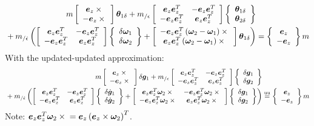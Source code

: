 \documentclass[10pt,fleqn,subeqn]{report}
\newcommand{\T}[1]{\bm{#1}}
\newcommand{\equu}{\overset{\text{uu}}{=}}
\begin{document}
\begin{align}
	m \sqbr{\matr{c}{
		\T{e}_z \times{}
		\\
		-\T{e}_z \times{}
	}} \T{\theta}_{1\delta}
	+
	m_{/\epsilon} \sqbr{\matr{cc}{
		\T{e}_z \T{e}_z^T & -\T{e}_z \T{e}_z^T
		\\
		-\T{e}_z \T{e}_z^T & \T{e}_z \T{e}_z^T
	}} \cubr{\cvvect{
		\T{\theta}_{1\delta}
		\\
		\T{\theta}_{2\delta}
	}}
	& \nonumber \\
	\mbox{} +
	m_{/\dot{\epsilon}} \plbr{
	\sqbr{\matr{cc}{
		\T{e}_z \T{e}_z^T & -\T{e}_z \T{e}_z^T
		\\
		-\T{e}_z \T{e}_z^T & \T{e}_z \T{e}_z^T
	}} \cubr{\cvvect{
		\delta\T{\omega}_1
		\\
		\delta\T{\omega}_2
	}}
	+
	\sqbr{\matr{c}{
		-\T{e}_z \T{e}_z^T \plbr{\T{\omega}_2 - \T{\omega}_1}\times{}
		\\
		\T{e}_z \T{e}_z^T \plbr{\T{\omega}_2 - \T{\omega}_1}\times{}
	}} \T{\theta}_{1\delta}
	}
	&=
	\cubr{\cvvect{
		\T{e}_z
		\\
		-\T{e}_z
	}} m
\end{align}
With the updated-updated approximation:
\begin{align}
	m \sqbr{\matr{c}{
		\T{e}_z \times{}
		\\
		-\T{e}_z \times{}
	}} \delta\T{g}_1
	+
	m_{/\epsilon} \sqbr{\matr{cc}{
		\T{e}_z \T{e}_z^T & -\T{e}_z \T{e}_z^T
		\\
		-\T{e}_z \T{e}_z^T & \T{e}_z \T{e}_z^T
	}} \cubr{\cvvect{
		\delta\T{g}_1
		\\
		\delta\T{g}_2
	}}
	& \nonumber \\
	\mbox{} +
	m_{/\dot{\epsilon}} \plbr{
	\sqbr{\matr{cc}{
		\T{e}_z \T{e}_z^T & -\T{e}_z \T{e}_z^T
		\\
		-\T{e}_z \T{e}_z^T & \T{e}_z \T{e}_z^T
	}} \cubr{\cvvect{
		\delta\dot{\T{g}}_1
		\\
		\delta\dot{\T{g}}_2
	}}
	+
	\sqbr{\matr{cc}{
		\T{e}_z \T{e}_z^T \T{\omega}_2\times{} & -\T{e}_z \T{e}_z^T \T{\omega}_2\times{}
		\\
		-\T{e}_z \T{e}_z^T \T{\omega}_2\times{} & \T{e}_z \T{e}_z^T \T{\omega}_2\times{}
	}} \cubr{\cvvect{
		\delta\T{g}_1
		\\
		\delta\T{g}_2
	}}
	}
	&\equu
	\cubr{\cvvect{
		\T{e}_z
		\\
		-\T{e}_z
	}} m
\end{align}
Note: $\T{e}_z \T{e}_z^T \T{\omega}_2\times{} = \T{e}_z \plbr{\T{e}_z\times\T{\omega}_2}^T$.
\end{document}
